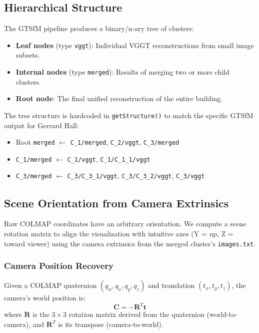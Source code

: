\documentclass[11pt, letterpaper]{article}
\begin{document}
\subsection{Hierarchical Structure}

The GTSfM pipeline produces a binary/n-ary tree of clusters:
\begin{itemize}
    \item \textbf{Leaf nodes} (type \texttt{vggt}): Individual VGGT reconstructions from small image subsets.
    \item \textbf{Internal nodes} (type \texttt{merged}): Results of merging two or more child clusters.
    \item \textbf{Root node}: The final unified reconstruction of the entire building.
\end{itemize}

The tree structure is hardcoded in \texttt{getStructure()} to match the specific GTSfM output for Gerrard Hall:
\begin{itemize}
    \item Root \texttt{merged} $\leftarrow$ \texttt{C\_1/merged}, \texttt{C\_2/vggt}, \texttt{C\_3/merged}
    \item \texttt{C\_1/merged} $\leftarrow$ \texttt{C\_1/vggt}, \texttt{C\_1/C\_1\_1/vggt}
    \item \texttt{C\_3/merged} $\leftarrow$ \texttt{C\_3/C\_3\_1/vggt}, \texttt{C\_3/C\_3\_2/vggt}, \texttt{C\_3/vggt}
\end{itemize}

\subsection{Scene Orientation from Camera Extrinsics}
\label{sec:scene-orientation}

Raw COLMAP coordinates have an arbitrary orientation. We compute a scene rotation matrix to align the visualization with intuitive axes (Y = up, Z = toward viewer) using the camera extrinsics from the merged cluster's \texttt{images.txt}.

\subsubsection{Camera Position Recovery}

Given a COLMAP quaternion $(q_w, q_x, q_y, q_z)$ and translation $(t_x, t_y, t_z)$, the camera's world position is:
\begin{equation}
    \mathbf{C} = -\mathbf{R}^T \mathbf{t}
\end{equation}
where $\mathbf{R}$ is the $3 \times 3$ rotation matrix derived from the quaternion (world-to-camera), and $\mathbf{R}^T$ is its transpose (camera-to-world).
\end{document}
